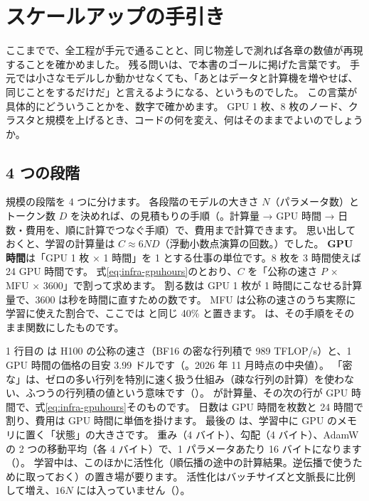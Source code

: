 \section{スケールアップの手引き}\label{sec:cap-scale}

ここまでで、全工程が手元で通ることと、同じ物差しで測れば各章の数値が再現することを確かめました。
残る問いは、で本書のゴールに掲げた言葉です。
手元では小さなモデルしか動かせなくても、「あとはデータと計算機を増やせば、同じことをするだけだ」と言えるようになる、というものでした。
この言葉が具体的にどういうことかを、数字で確かめます。
GPU 1 枚、8 枚のノード、クラスタと規模を上げるとき、コードの何を変え、何はそのままでよいのでしょうか。

\subsection*{4 つの段階}

規模の段階を 4 つに分けます。
各段階のモデルの大きさ $N$（パラメータ数）とトークン数 $D$ を決めれば、の見積もりの手順（。計算量 → GPU 時間 → 日数・費用を、順に計算でつなぐ手順）で、費用まで計算できます。
思い出しておくと、学習の計算量は $C\approx 6ND$（浮動小数点演算の回数。）でした。
\textbf{GPU 時間}は「GPU 1 枚 × 1 時間」を 1 とする仕事の単位です。8 枚を 3 時間使えば 24 GPU 時間です。
式\eqref{eq:infra-gpuhours}のとおり、$C$ を「公称の速さ $P$ × MFU × 3600」で割って求めます。
割る数は GPU 1 枚が 1 時間にこなせる計算量で、3600 は秒を時間に直すための数です。
MFU は公称の速さのうち実際に学習に使えた割合で、ここでは と同じ 40\% と置きます。
は、その手順をそのまま関数にしたものです。


1 行目の  は H100 の公称の速さ（BF16 の密な行列積で 989 TFLOP/s）と、1 GPU 時間の価格の目安 3.99 ドルです（。2026 年 11 月時点の中央値）。
「密な」は、ゼロの多い行列を特別に速く扱う仕組み（疎な行列の計算）を使わない、ふつうの行列積の値という意味です（）。
 が計算量、その次の行が GPU 時間で、式\eqref{eq:infra-gpuhours}そのものです。
日数は GPU 時間を枚数と 24 時間で割り、費用は GPU 時間に単価を掛けます。
最後の  は、学習中に GPU のメモリに置く「状態」の大きさです。
重み（4 バイト）、勾配（4 バイト）、AdamW の 2 つの移動平均（各 4 バイト）で、1 パラメータあたり 16 バイトになります（）。
学習中は、このほかに活性化（順伝播の途中の計算結果。逆伝播で使うために取っておく）の置き場が要ります。
活性化はバッチサイズと文脈長に比例して増え、$16N$ には入っていません（）。

